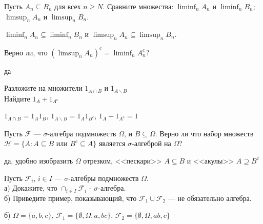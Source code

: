 \begin{problem}
Пусть $A_{n} \subseteq B_{n}$ для всех $n\ge N$. Сравните множества: $\liminf_{n}A_{n}$ и $\liminf_{n}B_{n}$;
$\limsup_{n}A_{n}$ и $\limsup_{n}B_{n}$. 
\end{problem} 
\begin{solution} 
$\liminf_{n}A_{n} \subseteq \liminf_{n}B_{n}$ и $\limsup_{n}A_{n}
\subseteq \limsup_{n}B_{n}$.
\end{solution}

\begin{problem}
Верно ли, что $\left(\limsup_{n}A_{n}\right)^{c}=\liminf_{n}A_{n}^{c}$? 
\end{problem} 
\begin{solution} 
да
\end{solution}

\begin{problem}
Разложите на множители $1_{A\cap B}$ и $1_{A\backslash B}$ \\
Найдите $1_{A}+1_{A^{c}}$ 
\end{problem} 
\begin{solution} 
 $1_{A\cap B}=1_{A}1_{B}$, $1_{A\backslash B}=1_{A}1_{B^{c}}$, $1_{A}+1_{A^{c}}=1$
\end{solution}

\begin{problem}
Пусть $\mathcal{F}$ --- $\sigma$-алгебра подмножеств $\Omega$, и
$B\subseteq\Omega$. Верно ли что набор множеств
$\mathcal{H}=\{A:A\subseteq B$ или $B^{c}\subseteq A\}$ является
$\sigma$-алгеброй на $\Omega$? 
\end{problem} 
\begin{solution} 
да, удобно изобразить $\Omega$ отрезком, <<пескари>> $A\subseteq B$ и <<акулы>> $A \supseteq B^{c}$ 
\end{solution}

\begin{problem}
Пусть $\mathcal{F}_{i}$, $i\in I$ --- $\sigma$-алгебры подмножеств
$\Omega$. \\
а) Докажите, что $\cap_{i\in I}\mathcal{F}_{i}$ -
$\sigma$-алгебра. \\
б) Приведите пример, показывающий, что
$\mathcal{F}_{1}\cup\mathcal{F}_{2}$ --- не обязательно алгебра. 
\end{problem} 
\begin{solution} 
 б) $\Omega=\{a,b,c\}$, $\mathcal{F}_{1}=\{\emptyset,\Omega,a,bc\}$, $\mathcal{F}_{2}=\{\emptyset,\Omega,ab,c\}$
\end{solution}

